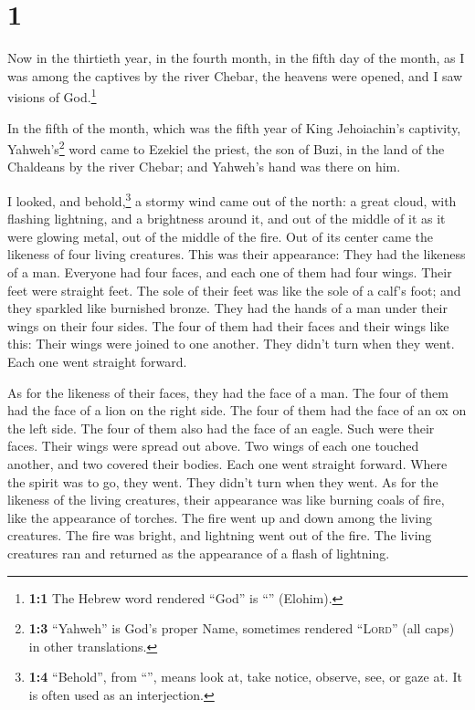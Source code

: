 \hypertarget{section}{%
\section{1}\label{section}}

 Now in the thirtieth year, in the fourth month, in the
fifth day of the month, as I was among the captives by the river Chebar,
the heavens were opened, and I saw visions of God.\footnote{\textbf{1:1}
  The Hebrew word rendered ``God'' is ``'' (Elohim).}

 In the fifth of the month, which was the fifth year of
King Jehoiachin's captivity,  Yahweh's\footnote{\textbf{1:3}
  ``Yahweh'' is God's proper Name, sometimes rendered ``\textsc{Lord}''
  (all caps) in other translations.} word came to Ezekiel the priest,
the son of Buzi, in the land of the Chaldeans by the river Chebar; and
Yahweh's hand was there on him.

 I looked, and behold,\footnote{\textbf{1:4} ``Behold'',
  from ``'', means look at, take notice, observe, see, or
  gaze at. It is often used as an interjection.} a stormy wind came out
of the north: a great cloud, with flashing lightning, and a brightness
around it, and out of the middle of it as it were glowing metal, out of
the middle of the fire.  Out of its center came the
likeness of four living creatures. This was their appearance: They had
the likeness of a man.  Everyone had four faces, and each
one of them had four wings.  Their feet were straight
feet. The sole of their feet was like the sole of a calf's foot; and
they sparkled like burnished bronze.  They had the hands
of a man under their wings on their four sides. The four of them had
their faces and their wings like this:  Their wings were
joined to one another. They didn't turn when they went. Each one went
straight forward.

 As for the likeness of their faces, they had the face of
a man. The four of them had the face of a lion on the right side. The
four of them had the face of an ox on the left side. The four of them
also had the face of an eagle.  Such were their faces.
Their wings were spread out above. Two wings of each one touched
another, and two covered their bodies.  Each one went
straight forward. Where the spirit was to go, they went. They didn't
turn when they went.  As for the likeness of the living
creatures, their appearance was like burning coals of fire, like the
appearance of torches. The fire went up and down among the living
creatures. The fire was bright, and lightning went out of the fire.
 The living creatures ran and returned as the appearance
of a flash of lightning.

